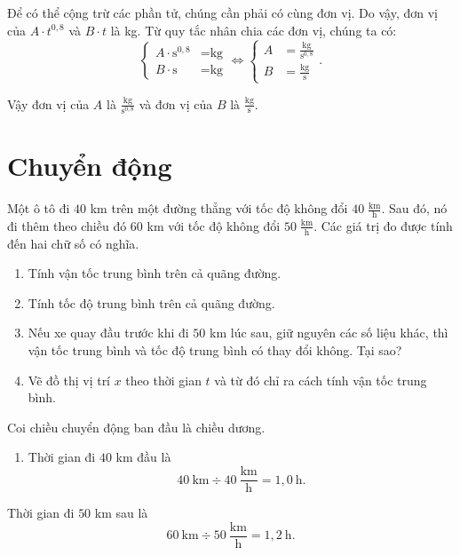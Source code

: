 \documentclass[a4paper, titlepage, openany]{book}
\newcounter{exercise}
\newcounter{solution}
\numberwithin{equation}{chapter}
\begin{document}
\solution

Để có thể cộng trừ các phần tử, chúng cần phải có cùng đơn vị. Do vậy, đơn vị của $A\cdot t^{0{,}8}$ và $B\cdot t$ là kg. Từ quy tắc nhân chia các đơn vị, chúng ta có:
\begin{equation*}
   \begin{cases}
     A\cdot \text{s}^{0{,}8} &=\text{kg} \\
     B\cdot\text{s} &=\text{kg}
   \end{cases}
   \iff
   \begin{cases}
      A &=\frac{\text{kg}}{\text{s}^{0{,}8}} \\
      B&=\frac{\text{kg}}{\text{s}}
   \end{cases}.
\end{equation*}

Vậy đơn vị của $A$ là $\boxed{\frac{\text{kg}}{\text{s}^{0{,}8}}}$ và đơn vị của $B$ là $\boxed{\frac{\text{kg}}{\text{s}}}$.

\chapter{Chuyển động}

\exercise Một ô tô đi $40$ km trên một đường thẳng với tốc độ không đổi $40\;\frac{\text{km}}{\text{h}}$. Sau đó, nó đi thêm theo chiều đó $60$ km với tốc độ không đổi $50\;\frac{\text{km}}{\text{h}}$. Các giá trị đo được tính đến hai chữ số có nghĩa.
\begin{enumerate}
   \item Tính vận tốc trung bình trên cả quãng đường.
   \item Tính tốc độ trung bình trên cả quãng đường.
   \item Nếu xe quay đầu trước khi đi $50$ km lúc sau, giữ nguyên các số liệu khác, thì vận tốc trung bình và tốc độ trung bình có thay đổi không. Tại sao?
   \item Vẽ đồ thị vị trí $x$ theo thời gian $t$ và từ đó chỉ ra cách tính vận tốc trung bình.
\end{enumerate}
\solution

Coi chiều chuyển động ban đầu là chiều dương.

\begin{enumerate}
   \item Thời gian đi $40$ km đầu là $$40\ \text{km}\div 40\ \frac{\text{km}}{\text{h}}=1{,}0\ \text{h}.$$
\end{enumerate}

Thời gian đi $50$ km sau là $$60\ \text{km}\div 50\ \frac{\text{km}}{\text{h}}=1{,}2\ \text{h}.$$
\end{document}
